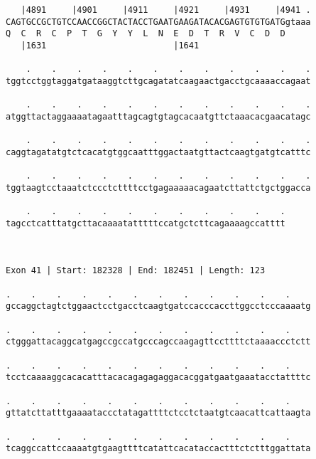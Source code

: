 \documentclass{article}
\begin{document}
\begin{Verbatim}
   |4891     |4901     |4911     |4921     |4931     |4941 .
CAGTGCCGCTGTCCAACCGGCTACTACCTGAATGAAGATACACGAGTGTGTGATGgtaaa
Q  C  R  C  P  T  G  Y  Y  L  N  E  D  T  R  V  C  D  D     
   |1631                         |1641                      
  
    .    .    .    .    .    .    .    .    .    .    .    .
tggtcctggtaggatgataaggtcttgcagatatcaagaactgacctgcaaaaccagaat
                                                            
    .    .    .    .    .    .    .    .    .    .    .    .
atggttactaggaaaatagaatttagcagtgtagcacaatgttctaaacacgaacatagc
                                                            
    .    .    .    .    .    .    .    .    .    .    .    .
caggtagatatgtctcacatgtggcaatttggactaatgttactcaagtgatgtcatttc
                                                            
    .    .    .    .    .    .    .    .    .    .    .    .
tggtaagtcctaaatctccctcttttcctgagaaaaacagaatcttattctgctggacca
                                                            
    .    .    .    .    .    .    .    .    .    .    .
tagcctcatttatgcttacaaaatatttttccatgctcttcagaaaagccatttt
                                                       
                                                       
 
Exon 41 | Start: 182328 | End: 182451 | Length: 123
 
.    .    .    .    .    .    .    .    .    .    .    .    
gccaggctagtctggaactcctgacctcaagtgatccacccaccttggcctcccaaaatg
                                                            
.    .    .    .    .    .    .    .    .    .    .    .    
ctgggattacaggcatgagccgccatgcccagccaagagttccttttctaaaaccctctt
                                                            
.    .    .    .    .    .    .    .    .    .    .    .    
tcctcaaaaggcacacatttacacagagagaggacacggatgaatgaaatacctattttc
                                                            
.    .    .    .    .    .    .    .    .    .    .    .    
gttatcttatttgaaaataccctatagattttctcctctaatgtcaacattcattaagta
                                                            
.    .    .    .    .    .    .    .    .    .    .    .    
tcaggccattccaaaatgtgaagttttcatattcacataccactttctctttggattata
                                                            

\end{Verbatim}
\end{document}
